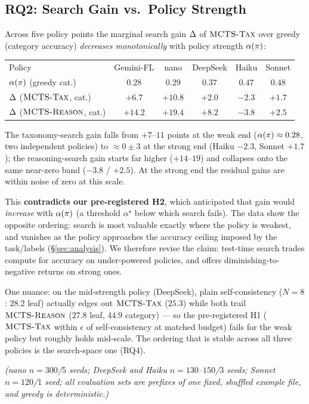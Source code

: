 \subsection{RQ2: Search Gain vs.\ Policy Strength}
Across five policy points the marginal search gain $\Delta$ of $\textsc{MCTS-Tax}$ over
greedy (category accuracy) \emph{decreases monotonically} with policy strength
$\alpha(\pi)$:
%
\begin{center}\small
\begin{tabular}{lccccc}
\toprule
Policy & Gemini-FL & nano & DeepSeek & Haiku & Sonnet \\
$\alpha(\pi)$ (greedy cat.) & $0.28$ & $0.29$ & $0.37$ & $0.47$ & $0.48$ \\
\midrule
$\Delta$ ($\textsc{MCTS-Tax}$, cat.) & $+6.7$ & $+10.8$ & $+2.0$ & $-2.3$ & $+1.7$ \\
$\Delta$ ($\textsc{MCTS-Reason}$, cat.) & $+14.2$ & $+19.4$ & $+8.2$ & $-3.8$ & $+2.5$ \\
\bottomrule
\end{tabular}
\end{center}
%
The taxonomy-search gain falls from $+7$--$11$ points at the weak end
($\alpha(\pi) \approx 0.28$, two independent policies) to $\approx 0 \pm 3$ at the
strong end (Haiku $-2.3$, Sonnet $+1.7$); the reasoning-search gain starts far
higher ($+14$--$19$) and collapses onto the same near-zero band ($-3.8$ /
$+2.5$). At the strong end the residual gains are within noise of zero at this scale.

This \textbf{contradicts our pre-registered H2}, which anticipated that gain would
\emph{increase} with $\alpha(\pi)$ (a threshold $\alpha^\star$ below which search
fails). The data show the opposite ordering: search is most valuable exactly where
the policy is weakest, and vanishes as the policy approaches the accuracy ceiling
imposed by the task/labels (\S\ref{sec:analysis}). We therefore revise the claim:
test-time search trades compute for accuracy on under-powered policies, and offers
diminishing-to-negative returns on strong ones.

One nuance: on the mid-strength policy (DeepSeek), plain self-consistency
($N{=}8$: $28.2$ leaf) actually edges out $\textsc{MCTS-Tax}$ ($25.3$) while both trail
$\textsc{MCTS-Reason}$ ($27.8$ leaf, $44.9$ category) --- so the pre-registered H1
($\textsc{MCTS-Tax}$ within $\epsilon$ of self-consistency at matched budget) fails for
the weak policy but roughly holds mid-scale. The ordering that is stable across
all three policies is the search-space one (RQ4).

\emph{(nano $n{=}300$/$5$ seeds; DeepSeek and Haiku $n{=}130$--$150$/$3$ seeds;
Sonnet $n{=}120$/$1$ seed; all evaluation sets are prefixes of one fixed,
shuffled example file, and greedy is deterministic.)}

